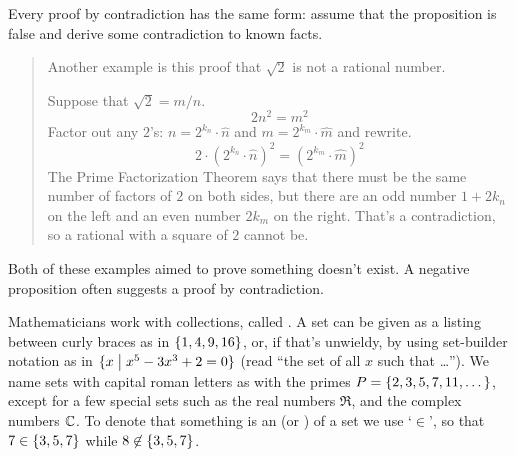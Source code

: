 Every proof by contradiction has the same form: assume that the proposition is
false and derive some contradiction to known facts.

\begin{quote}\small
Another example is this proof that
\( \sqrt{2} \) is not a rational number.

Suppose that  \( \sqrt{2}=m/n \).
\begin{equation*}
   2n^2=m^2
\end{equation*}
Factor out any \( 2 \)'s:
\( n=2^{k_n}\cdot \hat{n} \)
and
\( m=2^{k_m}\cdot \hat{m} \)
and rewrite.
\begin{equation*}
  2\cdot (2^{k_n}\cdot \hat{n})^2
  =
  (2^{k_m}\cdot \hat{m})^2
\end{equation*}
The Prime Factorization Theorem says that there must be the same number of
factors of \( 2 \) on both sides, but there are an odd number
\( 1+2k_n \) on the left and an even number \( 2k_m \) on the right.
That's a contradiction, so a rational with a square of
\( 2 \) cannot be.
\end{quote}

Both of these examples aimed to prove something doesn't exist.
A negative proposition often suggests a proof by contradiction.














{}
Mathematicians work with collections, called . 
A set can be given as a listing between curly braces as in
\( \mbox{$\{ 1,4,9,16 \}$} \), or, if that's
unwieldy, by using set-builder notation as in
\( \mbox{$\{x\bigm| x^5-3x^3+2=0 \}$} \) (read ``the set of all \( x \)
such that \ldots'').
We name sets with capital roman letters as with the primes
\( P=\mbox{$\{2,3,5,7,11,\ldots\,\}$} \), except for a few special sets such as the
real numbers \( \Re \),
and the complex numbers \( \mathbb{C} \).
To denote that something is an 
(or ) of a set we
use `\( {}\in {} \)',
so that \( 7\in\mbox{$\{3,5,7\}$} \) while \( 8\not\in\mbox{$\{3,5,7\}$} \).

